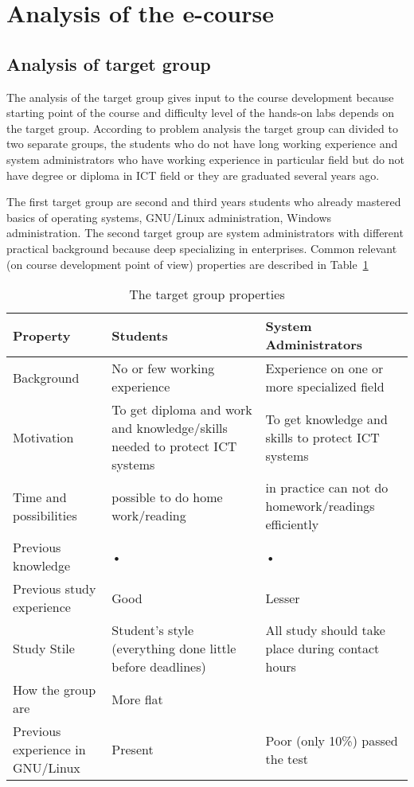 \section{Analysis of the e-course}
\subsection{Analysis of target group}
The analysis of the target group gives input to the course development because starting point of the course and difficulty level of the hands-on labs depends on the target group. According to problem analysis the target group can divided to two separate groups, the students who do not have long working experience and system administrators who have working experience in particular field but do not have degree or diploma in \gls{ICT} field or they are graduated several years ago.

The first target group are second and third years students who already mastered basics of operating systems, GNU/Linux administration, Windows administration. The second target group are system administrators with different practical background because deep specializing in enterprises. Common relevant (on course development point of view)  properties are described in Table~\ref{tab:targetgroup}
\begin{table}[h]
\centering
\caption{The target group properties}

\begin{tabular}{|p{4cm}|p{5cm}|p{5cm}|}
\hline 
\color{blue}
Property & \color{blue} Students & \color{blue} System Administrators \\ 
\hline 
Background & No or few working experience & Experience on one or more specialized field \\ 
\hline 
Motivation & To get diploma and work and knowledge/skills needed to protect \gls{ICT} systems & To get knowledge and skills to protect \gls{ICT} systems \\ 
\hline 
Time and possibilities & possible to do home work/reading & in practice can not do homework/readings efficiently  \\ 
\hline 
Previous knowledge & • & • \\ 
\hline 
Previous study experience & Good & Lesser \\ 
\hline 
Study Stile & Student's style (everything done little before deadlines) & All study should take place during contact hours  \\ 
\hline 
How {\color{red}{homogeenne}} the group are  & More flat & {\color{red}{ebaühtlane}} \\ 
\hline 
Previous experience in GNU/Linux & Present & Poor (only 10\%) passed the test  \\ 
\hline 
\end{tabular} 

\label{tab:targetgroup}
\end{table}

